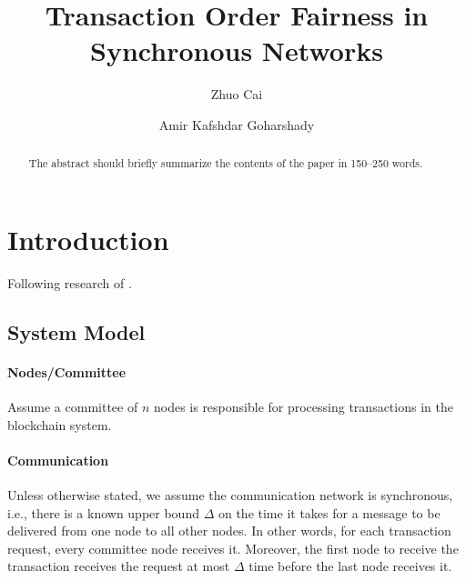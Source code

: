 \documentclass[runningheads]{llncs}
\begin{document}
%
\title{Transaction Order Fairness in Synchronous Networks}
%
%
\author{Zhuo Cai \and
Amir Kafshdar Goharshady}
%
%
%
\maketitle              %
%
\begin{abstract}
The abstract should briefly summarize the contents of the paper in
150--250 words.

\end{abstract}
%
%

\section{Introduction}
Following research of \cite{DBLP:conf/crypto/Kelkar0GJ20}. 

\subsection{System Model}
\paragraph{Nodes/Committee} Assume a committee of $n$ nodes is responsible for processing transactions in the blockchain system. 

\paragraph{Communication} Unless otherwise stated, we assume the communication network is synchronous, i.e., there is a known upper bound $\Delta$ on the time it takes for a message to be delivered from one node to all other nodes. In other words, for each transaction request, every committee node receives it. Moreover, the first node to receive the transaction receives the request at most $\Delta$ time before the last node receives it. 
\end{document}
